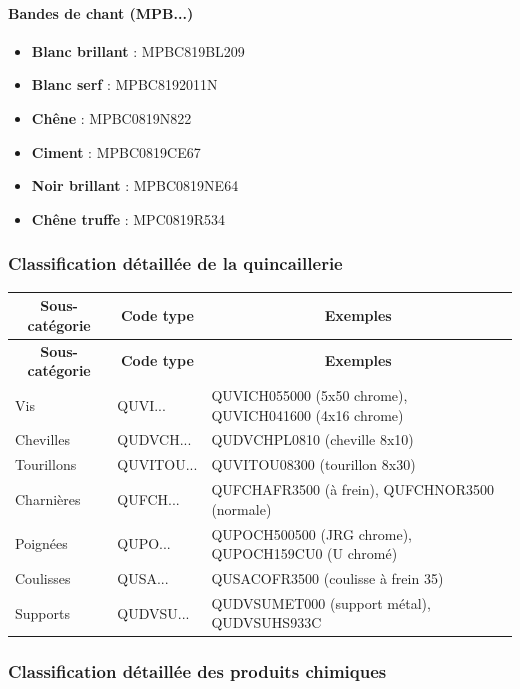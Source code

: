 \documentclass[12pt,a4paper]{article}
\begin{document}
\paragraph{Bandes de chant (MPB...)}
\begin{itemize}
    \item \textbf{Blanc brillant} : MPBC819BL209
    \item \textbf{Blanc serf} : MPBC8192011N
    \item \textbf{Chêne} : MPBC0819N822
    \item \textbf{Ciment} : MPBC0819CE67
    \item \textbf{Noir brillant} : MPBC0819NE64
    \item \textbf{Chêne truffe} : MPC0819R534
\end{itemize}

\subsubsection{Classification détaillée de la quincaillerie}

\begin{longtable}{|p{3cm}|p{4cm}|p{9cm}|}
\hline
\multicolumn{1}{|c|}{\textbf{Sous-catégorie}} & \multicolumn{1}{c|}{\textbf{Code type}} & \multicolumn{1}{c|}{\textbf{Exemples}} \\
\hline
\endfirsthead
\hline
\multicolumn{1}{|c|}{\textbf{Sous-catégorie}} & \multicolumn{1}{c|}{\textbf{Code type}} & \multicolumn{1}{c|}{\textbf{Exemples}} \\
\hline
\endhead
\hline
\endfoot
Vis & QUVI... & QUVICH055000 (5x50 chrome), QUVICH041600 (4x16 chrome) \\
Chevilles & QUDVCH... & QUDVCHPL0810 (cheville 8x10) \\
Tourillons & QUVITOU... & QUVITOU08300 (tourillon 8x30) \\
Charnières & QUFCH... & QUFCHAFR3500 (à frein), QUFCHNOR3500 (normale) \\
Poignées & QUPO... & QUPOCH500500 (JRG chrome), QUPOCH159CU0 (U chromé) \\
Coulisses & QUSA... & QUSACOFR3500 (coulisse à frein 35) \\
Supports & QUDVSU... & QUDVSUMET000 (support métal), QUDVSUHS933C \\
\hline
\end{longtable}

\subsubsection{Classification détaillée des produits chimiques}
\end{document}

